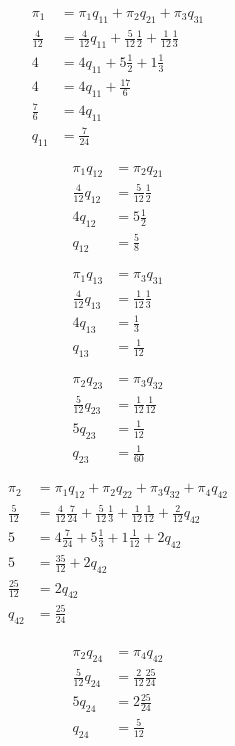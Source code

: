 \documentclass[12pt]{article}
\begin{document}
\begin{align*}
	\pi_1 &= \pi_1 q_{11} + \pi_2 q_{21} + \pi_3 q_{31} \\
	\frac{4}{12} &= \frac{4}{12} q_{11} + \frac{5}{12} \frac{1}{2} + \frac{1}{12} \frac{1}{3} \\
	4 &= 4 q_{11} + 5 \frac{1}{2} + 1 \frac{1}{3} \\
	4 &= 4 q_{11} + \frac{17}{6} \\
	\frac{7}{6} &= 4 q_{11} \\
	q_{11} &= \frac{7}{24}
\end{align*}

\begin{align*}
	\pi_1 q_{12} &= \pi_2 q_{21} \\
	\frac{4}{12} q_{12} &= \frac{5}{12} \frac{1}{2} \\
	4 q_{12} &= 5 \frac{1}{2} \\
	q_{12} &= \frac{5}{8}
\end{align*}

\begin{align*}
	\pi_1 q_{13} &= \pi_3 q_{31} \\
	\frac{4}{12} q_{13} &= \frac{1}{12} \frac{1}{3} \\
	4 q_{13} &= \frac{1}{3} \\
	q_{13} &= \frac{1}{12}
\end{align*}

\begin{align*}
	\pi_2 q_{23} &= \pi_3 q_{32} \\
	\frac{5}{12} q_{23} &= \frac{1}{12} \frac{1}{12} \\
	5 q_{23} &= \frac{1}{12} \\
	q_{23} &= \frac{1}{60}
\end{align*}

\begin{align*}
	\pi_2 &= \pi_1 q_{12} + \pi_2 q_{22} + \pi_3 q_{32} + \pi_4 q_{42} \\
	\frac{5}{12} &= \frac{4}{12} \frac{7}{24} + \frac{5}{12} \frac{1}{3} + \frac{1}{12} \frac{1}{12} + \frac{2}{12} q_{42} \\
	5 &= 4 \frac{7}{24} + 5 \frac{1}{3} + 1 \frac{1}{12} + 2 q_{42} \\
	5 &= \frac{35}{12} + 2 q_{42} \\
	\frac{25}{12} &= 2 q_{42} \\
	q_{42} &= \frac{25}{24}  \\
\end{align*}

\begin{align*}
	\pi_2 q_{24} &= \pi_4 q_{42} \\
	\frac{5}{12} q_{24} &= \frac{2}{12} \frac{25}{24} \\
	5 q_{24} &= 2 \frac{25}{24} \\
	q_{24} &= \frac{5}{12}
\end{align*}
\end{document}
